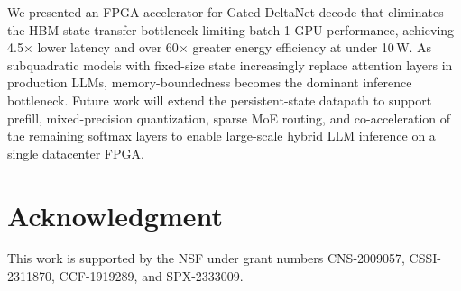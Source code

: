 \documentclass[conference]{IEEEtran}
\begin{document}


We presented an FPGA accelerator for Gated DeltaNet decode that eliminates
  the HBM state-transfer bottleneck limiting batch-1 GPU performance,                                                                                    
  achieving 4.5$\times$ lower latency and over 60$\times$ greater energy
  efficiency at under 10\,W. As subquadratic models with fixed-size state increasingly                                                                              
  replace attention layers in production LLMs, memory-boundedness becomes the
  dominant inference bottleneck. Future work will extend the persistent-state
  datapath to support prefill, mixed-precision quantization, sparse MoE
  routing, and co-acceleration of the remaining softmax layers to enable large-scale
  hybrid LLM inference on a single datacenter FPGA.

\section*{Acknowledgment}
This work is supported by the NSF under grant numbers CNS-2009057, CSSI-2311870, CCF-1919289, and SPX-2333009.



\end{document}
